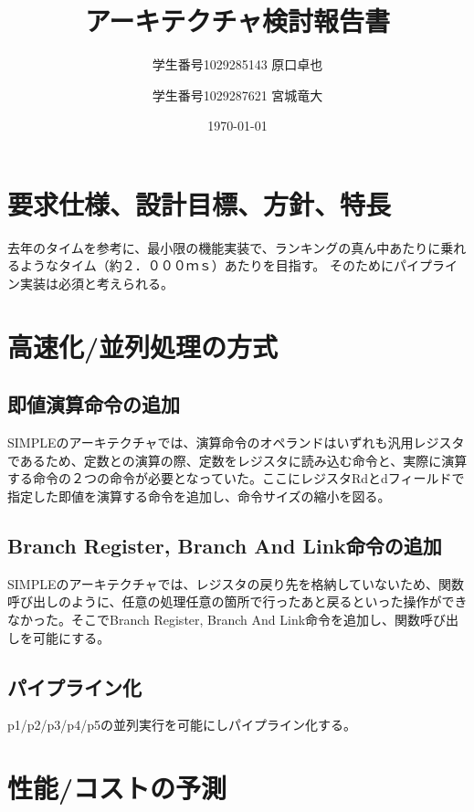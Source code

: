 \documentclass{jsreport}
\title{アーキテクチャ検討報告書}
\author{学生番号1029285143 原口卓也 \and 学生番号1029287621 宮城竜大}
\date{\today}
\begin{document}
\begin{titlepage}
\maketitle
\end{titlepage}
\clearpage

\section{要求仕様、設計目標、方針、特長}
去年のタイムを参考に、最小限の機能実装で、ランキングの真ん中あたりに乗れるようなタイム（約２．０００ｍｓ）あたりを目指す。
そのためにパイプライン実装は必須と考えられる。

\section{高速化/並列処理の方式}
	\subsection{即値演算命令の追加}
        SIMPLEのアーキテクチャでは、演算命令のオペランドはいずれも汎用レジスタであるため、定数との演算の際、定数をレジスタに読み込む命令と、実際に演算する命令の２つの命令が必要となっていた。ここにレジスタRdとdフィールドで指定した即値を演算する命令を追加し、命令サイズの縮小を図る。
    
    \subsection{Branch Register, Branch And Link命令の追加}
    	SIMPLEのアーキテクチャでは、レジスタの戻り先を格納していないため、関数呼び出しのように、任意の処理任意の箇所で行ったあと戻るといった操作ができなかった。そこでBranch Register, Branch And Link命令を追加し、関数呼び出しを可能にする。
        
	\subsection{パイプライン化}
    	p1/p2/p3/p4/p5の並列実行を可能にしパイプライン化する。

\section{性能/コストの予測}
\end{document}
